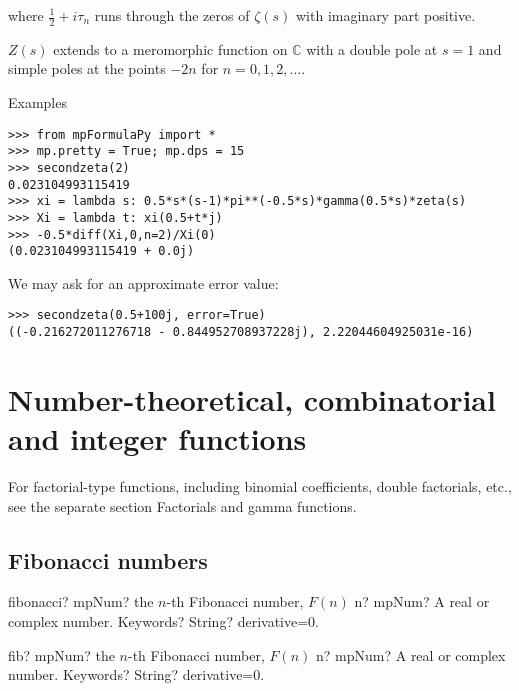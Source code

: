 where $\tfrac{1}{2}+i\tau_n$ runs through the zeros of $\zeta(s)$ with imaginary part positive.

\vpara
$Z(s)$ extends to a meromorphic function on $\mathbb{C}$ with a double pole at $s=1$ and simple poles at the points $-2n$ for $n=0,1,2,\ldots$.

Examples

\begin{lstlisting}
>>> from mpFormulaPy import *
>>> mp.pretty = True; mp.dps = 15
>>> secondzeta(2)
0.023104993115419
>>> xi = lambda s: 0.5*s*(s-1)*pi**(-0.5*s)*gamma(0.5*s)*zeta(s)
>>> Xi = lambda t: xi(0.5+t*j)
>>> -0.5*diff(Xi,0,n=2)/Xi(0)
(0.023104993115419 + 0.0j)
\end{lstlisting}

We may ask for an approximate error value:

\begin{lstlisting}
>>> secondzeta(0.5+100j, error=True)
((-0.216272011276718 - 0.844952708937228j), 2.22044604925031e-16)
\end{lstlisting}



\newpage
\chapter{Number-theoretical, combinatorial and integer functions}
For factorial-type functions, including binomial coefficients, double factorials, etc., see the separate section Factorials and gamma functions.


\section{Fibonacci numbers}


\begin{mpFunctionsExtract}
	\mpFunctionTwo
	{fibonacci? mpNum? the $n$-th Fibonacci number, $F(n)$}
	{n? mpNum? A real or complex number.}
	{Keywords? String? derivative=0.}	
\end{mpFunctionsExtract}


\vspace{0.6cm}

\begin{mpFunctionsExtract}
	\mpFunctionTwo
	{fib? mpNum? the $n$-th Fibonacci number, $F(n)$}
	{n? mpNum? A real or complex number.}
	{Keywords? String? derivative=0.}	
\end{mpFunctionsExtract}

